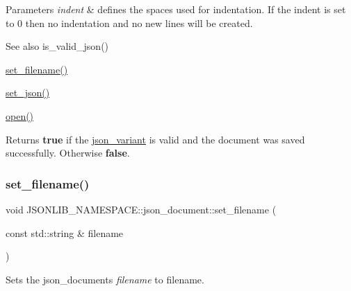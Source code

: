\begin{DoxyParams}{Parameters}
{\em indent} & defines the spaces used for indentation. If the indent is set to 0 then no indentation and no new lines will be created. \\
\hline
\end{DoxyParams}
\begin{DoxySeeAlso}{See also}
is\+\_\+valid\+\_\+json() 

\hyperlink{classJSONLIB__NAMESPACE_1_1json__document_acc406344661e361c75ac7bc307057712}{set\+\_\+filename()} 

\hyperlink{classJSONLIB__NAMESPACE_1_1json__document_a5a72e4dc0b37b95c70baefad930b5b71}{set\+\_\+json()} 

\hyperlink{classJSONLIB__NAMESPACE_1_1json__document_a08e509059e628742f35716dddce2d740}{open()} 
\end{DoxySeeAlso}
\begin{DoxyReturn}{Returns}
{\bfseries true} if the \hyperlink{classJSONLIB__NAMESPACE_1_1json__variant}{json\+\_\+variant} is valid and the document was saved successfully. Otherwise {\bfseries false}. 
\end{DoxyReturn}
\mbox{\label{classJSONLIB__NAMESPACE_1_1json__document_acc406344661e361c75ac7bc307057712}} 
\subsubsection{\texorpdfstring{set\+\_\+filename()}{set\_filename()}\hspace{0.1cm}{\footnotesize\ttfamily [1/2]}}
{\footnotesize\ttfamily void J\+S\+O\+N\+L\+I\+B\+\_\+\+N\+A\+M\+E\+S\+P\+A\+C\+E\+::json\+\_\+document\+::set\+\_\+filename (\begin{DoxyParamCaption}\item[{const std\+::string \&}]{filename }\end{DoxyParamCaption})}



Sets the json\+\_\+documents {\itshape filename} to {\ttfamily filename}. 


